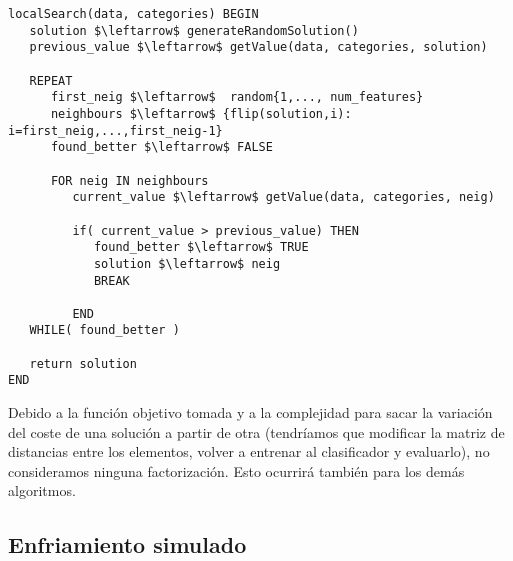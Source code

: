 \documentclass[11pt,leqno]{article}
\begin{document}
	\begin{lstlisting}[mathescape=true]
localSearch(data, categories) BEGIN
   solution $\leftarrow$ generateRandomSolution()
   previous_value $\leftarrow$ getValue(data, categories, solution)
	
   REPEAT
      first_neig $\leftarrow$  random{1,..., num_features}
      neighbours $\leftarrow$ {flip(solution,i): i=first_neig,...,first_neig-1}
      found_better $\leftarrow$ FALSE
		
      FOR neig IN neighbours
         current_value $\leftarrow$ getValue(data, categories, neig)
			
         if( current_value > previous_value) THEN
            found_better $\leftarrow$ TRUE
            solution $\leftarrow$ neig
            BREAK
		
         END
   WHILE( found_better )
	
   return solution
END
	\end{lstlisting}
	
	Debido a la función objetivo tomada y a la complejidad para sacar la variación del coste de una solución a partir de otra (tendríamos que modificar la matriz de distancias entre los elementos, volver a entrenar al clasificador y evaluarlo), no consideramos ninguna factorización. Esto ocurrirá también para los demás algoritmos.

\subsection{Enfriamiento simulado}
\end{document}
